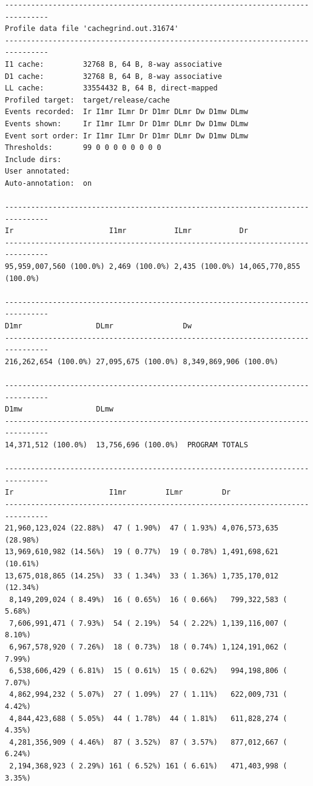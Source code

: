 \documentclass{article}
\begin{document}
\begin{verbatim}
--------------------------------------------------------------------------------
Profile data file 'cachegrind.out.31674'
--------------------------------------------------------------------------------
I1 cache:         32768 B, 64 B, 8-way associative
D1 cache:         32768 B, 64 B, 8-way associative
LL cache:         33554432 B, 64 B, direct-mapped
Profiled target:  target/release/cache
Events recorded:  Ir I1mr ILmr Dr D1mr DLmr Dw D1mw DLmw
Events shown:     Ir I1mr ILmr Dr D1mr DLmr Dw D1mw DLmw
Event sort order: Ir I1mr ILmr Dr D1mr DLmr Dw D1mw DLmw
Thresholds:       99 0 0 0 0 0 0 0 0
Include dirs:     
User annotated:   
Auto-annotation:  on

--------------------------------------------------------------------------------
Ir                      I1mr           ILmr           Dr                      
--------------------------------------------------------------------------------
95,959,007,560 (100.0%) 2,469 (100.0%) 2,435 (100.0%) 14,065,770,855 (100.0%) 

--------------------------------------------------------------------------------
D1mr                 DLmr                Dw                                     
--------------------------------------------------------------------------------              
216,262,654 (100.0%) 27,095,675 (100.0%) 8,349,869,906 (100.0%)  

--------------------------------------------------------------------------------
D1mw                 DLmw
--------------------------------------------------------------------------------
14,371,512 (100.0%)  13,756,696 (100.0%)  PROGRAM TOTALS

--------------------------------------------------------------------------------
Ir                      I1mr         ILmr         Dr                     
--------------------------------------------------------------------------------
21,960,123,024 (22.88%)  47 ( 1.90%)  47 ( 1.93%) 4,076,573,635 (28.98%) 
13,969,610,982 (14.56%)  19 ( 0.77%)  19 ( 0.78%) 1,491,698,621 (10.61%) 
13,675,018,865 (14.25%)  33 ( 1.34%)  33 ( 1.36%) 1,735,170,012 (12.34%) 
 8,149,209,024 ( 8.49%)  16 ( 0.65%)  16 ( 0.66%)   799,322,583 ( 5.68%) 
 7,606,991,471 ( 7.93%)  54 ( 2.19%)  54 ( 2.22%) 1,139,116,007 ( 8.10%) 
 6,967,578,920 ( 7.26%)  18 ( 0.73%)  18 ( 0.74%) 1,124,191,062 ( 7.99%) 
 6,538,606,429 ( 6.81%)  15 ( 0.61%)  15 ( 0.62%)   994,198,806 ( 7.07%) 
 4,862,994,232 ( 5.07%)  27 ( 1.09%)  27 ( 1.11%)   622,009,731 ( 4.42%) 
 4,844,423,688 ( 5.05%)  44 ( 1.78%)  44 ( 1.81%)   611,828,274 ( 4.35%) 
 4,281,356,909 ( 4.46%)  87 ( 3.52%)  87 ( 3.57%)   877,012,667 ( 6.24%) 
 2,194,368,923 ( 2.29%) 161 ( 6.52%) 161 ( 6.61%)   471,403,998 ( 3.35%) 



\end{verbatim}
\end{document}
